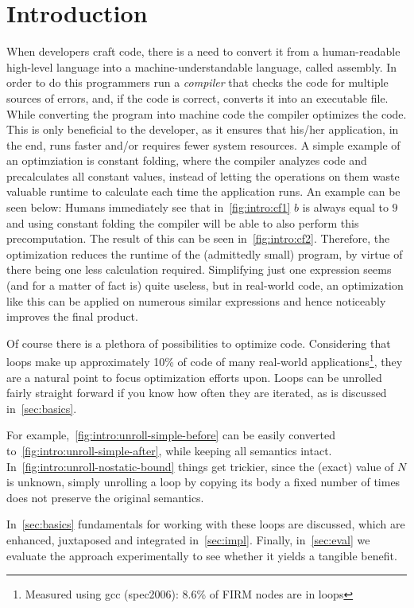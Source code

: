\chapter{Introduction}\label{sec:intro}



When developers craft code, there is a need to convert it from a human-readable high-level language into a machine-understandable language, called assembly.
In order to do this programmers run a \textit{compiler} that checks the code for multiple sources of errors, and, if the code is correct, converts it into an executable file.
While converting the program into machine code the compiler optimizes the code.
This is only beneficial to the developer, as it ensures that his/her application, in the end, runs faster and/or requires fewer system resources.
A simple example of an optimziation is constant folding, where the compiler analyzes code and precalculates all constant values, instead of letting the operations on them waste valuable runtime to calculate each time the application runs.
An example can be seen below:
Humans immediately see that in~\cref{fig:intro:cf1} $b$ is always equal to $9$ and using constant folding the compiler will be able to also perform this precomputation.
The result of this can be seen in~\cref{fig:intro:cf2}.
Therefore, the optimization reduces the runtime of the (admittedly small) program, by virtue of there being one less calculation required.
Simplifying just one expression seems (and for a matter of fact is) quite useless, but in real-world code, an optimization like this can be applied on numerous similar expressions and hence noticeably improves the final product.



Of course there is a plethora of possibilities to optimize code.
Considering that loops make up approximately 10\% of code of many real-world applications\footnote{Measured using gcc (spec2006): 8.6\% of FIRM nodes are in loops}, they are a natural point to focus optimization efforts upon.
Loops can be unrolled fairly straight forward if you know how often they are iterated, as is discussed in~\cref{sec:basics}.

For example,~\cref{fig:intro:unroll-simple-before} can be easily converted to~\cref{fig:intro:unroll-simple-after}, while keeping all semantics intact.
In~\cref{fig:intro:unroll-nostatic-bound} things get trickier, since the (exact) value of $N$ is unknown, simply unrolling a loop by copying its body a fixed number of times does not preserve the original semantics.

In~\cref{sec:basics} fundamentals for working with these loops are discussed, which are enhanced, juxtaposed and integrated in~\cref{sec:impl}.
Finally, in~\cref{sec:eval} we evaluate the approach experimentally to see whether it yields a tangible benefit.



